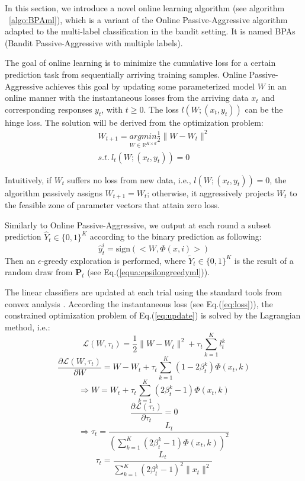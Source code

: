 In this section, we introduce a novel online learning algorithm (see algorithm ~\ref{algo:BPAml}), which is a variant of the Online Passive-Aggressive algorithm adapted to the multi-label classification in the bandit setting. It is named BPAs (Bandit Passive-Aggressive with multiple labels).

The goal of online learning is to minimize the cumulative loss for a certain prediction task from  sequentially arriving training samples.  Online Passive-Aggressive achieves this goal by updating some parameterized model $W$ in an online manner with the instantaneous losses from the arriving data $x_{t}$ and corresponding responses $y_{t}$, with $t\geqslant 0$. The loss $l(W;(x_t,y_t))$ can be the hinge loss. The solution will be derived from the optimization problem:
\begin{equation}
\begin{split}
\label{eq:update}
W_{t+1} = \underset{W\in \mathbb{R}^{K\times d}}{argmin}\frac{1}{2}\parallel{W-W_t}\parallel^2 \\ 
s.t.\ l_t\left(W;(x_t,y_t)\right)=0
\end{split}
\end{equation}

Intuitively, if $W_t$ suffers no loss from new data, i.e., $l\left(W;(x_t,y_t)\right) = 0$, the algorithm passively assigns $W_{t+1} = W_t$; otherwise, it aggressively projects $W_t$ to the feasible zone of parameter vectors that attain zero loss. 

Similarly to Online Passive-Aggressive, we output at each round  a subset prediction $\hat{Y}_t \in \{0,1\}^K $ %
according to the binary prediction as following:
\[\hat{y}_t^i = \text{sign}(<W,\Phi(x,i)>)\]
Then an $\epsilon$-greedy exploration is performed, where $\tilde{Y}_t\in \{0,1\}^K$ is the result of a random draw from  $\mathbf{P}_t$ (see Eq.(\ref{equa:epsilongreedyml})).

The linear classifiers are updated at each trial using the standard tools from convex analysis \cite{Boyd04}. According the instantaneous loss (see Eq.(\ref{eq:loss})), the constrained optimization problem of Eq.(\ref{eq:update}) is solved by the Lagrangian method, i.e.:
\begin{equation}
\label{eq:BPAOptimization}
\mathscr{L}(W, \tau_t) = \frac{1}{2}\parallel{W-W_t}\parallel^2 + \tau_t \sum_{k=1}^{K}l_t^k
\end{equation}
\[\frac{\partial \mathscr{L}(W,\tau_t)}{\partial W} = W-W_t + \tau_t\sum_{k=1}^{K}(1-2\beta_t^k)\Phi(x_t, k)\]
\begin{equation}\label{eq:w}
\Rightarrow W = W_t + \tau_t \sum_{k=1}^{K}\left(2\beta_t^k-1\right)\Phi(x_t,k)\end{equation}
\[\frac{\partial \mathscr{L}(\tau_t)}{\partial \tau_t} = 0\]
\[\Rightarrow \tau_t = \frac{L_t}{(\sum_{k=1}^{K}(2\beta_t^k-1)\Phi(x_t,k))^2}\]
\begin{equation}\label{eq:tau}
\tau_t = \frac{L_t}{\sum_{k=1}^{K}(2\beta_t^k-1)^2\parallel{x_t}\parallel^2}
\end{equation}

